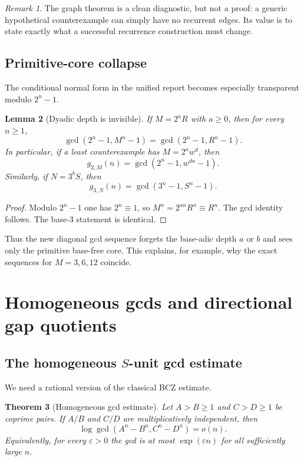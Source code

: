 \documentclass[11pt,oneside]{article}
\newtheorem{theorem}{Theorem}[section]
\newtheorem{lemma}[theorem]{Lemma}
\theoremstyle{definition}
\theoremstyle{remark}
\newtheorem{remark}[theorem]{Remark}
\begin{document}
\begin{remark}
The graph theorem is a clean diagnostic, but not a proof: a generic hypothetical
counterexample can simply have no recurrent edges.  Its value is to state exactly what a
successful recurrence construction must change.
\end{remark}

\subsection{Primitive-core collapse}

The conditional normal form in the unified report becomes especially transparent modulo
$2^n-1$.

\begin{lemma}[Dyadic depth is invisible]
\label{lem:core-collapse}
If $M=2^aR$ with $a\ge0$, then for every $n\ge1$,
\[
 \gcd(2^n-1,M^n-1)=\gcd(2^n-1,R^n-1).
\]
In particular, if a least counterexample has $M=2^aw^d$, then
\[
 g_{2,M}(n)=\gcd(2^n-1,w^{dn}-1).
\]
Similarly, if $N=3^bS$, then
\[
 g_{3,N}(n)=\gcd(3^n-1,S^n-1).
\]
\end{lemma}

\begin{proof}
Modulo $2^n-1$ one has $2^n\equiv1$, so
$M^n=2^{an}R^n\equiv R^n$.  The gcd identity follows.  The base-$3$ statement is identical.
\end{proof}

Thus the new diagonal gcd sequence forgets the base-adic depth $a$ or $b$ and sees only the
primitive base-free core.  This explains, for example, why the exact sequences for
$M=3,6,12$ coincide.

\section{Homogeneous gcds and directional gap quotients}
\label{sec:directional}

\subsection{The homogeneous $S$-unit gcd estimate}

We need a rational version of the classical BCZ estimate.

\begin{theorem}[Homogeneous gcd estimate]
\label{thm:homogeneous-gcd}
Let $A>B\ge1$ and $C>D\ge1$ be coprime pairs.  If $A/B$ and $C/D$ are
multiplicatively independent, then
\[
 \log\gcd(A^n-B^n,C^n-D^n)=o(n).
\]
Equivalently, for every $\varepsilon>0$ the gcd is at most $\exp(\varepsilon n)$ for all
sufficiently large $n$.
\end{theorem}
\end{document}

